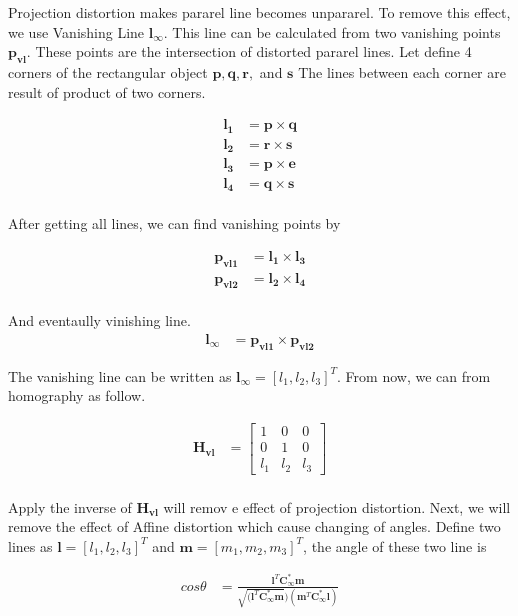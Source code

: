 \documentclass[11pt]{article}
\begin{document}
Projection distortion makes pararel line becomes unpararel. To remove this effect, we use Vanishing Line $\mathbf{l_\infty}$. This line can be calculated from two vanishing points $\mathbf{p_{vl}}$. These points are the intersection of distorted pararel lines. Let define 4 corners of the rectangular object $\mathbf{p}, \mathbf{q}, \mathbf{r},$ and $\mathbf{s}$ The lines between each corner are result of product of two corners.

\begin{align*}
\mathbf{l_1} &= \mathbf{p} \times \mathbf{q} \\
\mathbf{l_2} &= \mathbf{r} \times \mathbf{s} \\
\mathbf{l_3} &= \mathbf{p} \times \mathbf{e} \\
\mathbf{l_4} &= \mathbf{q} \times \mathbf{s} \\
\end{align*}

After getting all lines, we can find vanishing points by

\begin{align*}
\mathbf{p_{vl1}} &= \mathbf{l_1} \times \mathbf{l_3} \\
\mathbf{p_{vl2}} &= \mathbf{l_2} \times \mathbf{l_4} \\
\end{align*}

And eventaully vinishing line.
\begin{align*}
 \mathbf{l_\infty} &= \mathbf{p_{vl1}} \times \mathbf{p_{vl2}} 
\end{align*}

The vanishing line can be written as $ \mathbf{l_\infty} = [l_1, l_2,l_3]^T$. From now, we can from homography as follow.

\begin{align*}
\mathbf{H_{vl}} &= 
\begin{bmatrix}
1 & 0 & 0\\
0 & 1 & 0 \\
l_1 & l_2 & l_3
\end{bmatrix} \\
\end{align*}

Apply the inverse of $\mathbf{H_{vl}}$ will remov e effect of projection distortion. Next, we will remove the effect of Affine distortion which cause changing of angles. Define two lines as $\mathbf{l} = [l_1, l_2,l_3]^T $ and $\mathbf{m} = [m_1, m_2,m_3]^T $, the angle of these two line is


\begin{align*}
 cos \theta &= \frac{\mathbf{l}^T \mathbf{C_{\infty}^*}\mathbf{m}}{\sqrt{(\mathbf{l}^T \mathbf{C_{\infty}^*}\mathbf{m}})(\mathbf{m}^T \mathbf{C_{\infty}^*}\mathbf{l})} 
\end{align*}
\end{document}
